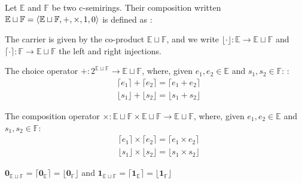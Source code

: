 \begin{definition}Let $\mathbb{E}$ and $\mathbb{F}$ be two c-semirings. Their composition written $\mathbb{E} \sqcup \mathbb{F} = \left\langle \mathbb{E} \sqcup \mathbb{F}, +, \times, \boldmath{1},\boldmath{0} \right\rangle$ is defined as :
	\begin{list}{-}{}
		\item The carrier is given by the co-product $\mathbb{E} \sqcup \mathbb{F}$, and we write $\lfloor \cdot \rfloor : \mathbb{E} \rightarrow \mathbb{E} \sqcup \mathbb{F}$ and $\lceil \cdot \rceil : \mathbb{F} \rightarrow \mathbb{E} \sqcup \mathbb{F}$ the left and right injections.
		\item The choice operator $+ : 2^{\mathbb{E} \sqcup \mathbb{F}} \rightarrow \mathbb{E} \sqcup \mathbb{F}$, where, given $e_1,e_2 \in \mathbb{E}$ and $s_1,s_2 \in \mathbb{F}$: : 
		\begin{align*}
			& \lceil e_1 \rceil + \lceil e_2 \rceil = \lceil e_1 + e_2 \rceil \\
			& \lfloor s_1 \rfloor + \lfloor s_2 \rfloor = \lfloor s_1 + s_2 \rfloor  %
		\end{align*}
		\item The composition operator $\times : \mathbb{E} \sqcup \mathbb{F} \times \mathbb{E} \sqcup \mathbb{F} \rightarrow \mathbb{E} \sqcup \mathbb{F}$, where, given $e_1,e_2 \in \mathbb{E}$ and $s_1,s_2 \in \mathbb{F}$:
		\begin{align*}
			& \lceil e_1 \rceil \times \lceil e_2 \rceil = \lceil e_1 \times e_2 \rceil \\
			& \lfloor s_1 \rfloor \times \lfloor s_2 \rfloor = \lfloor s_1 \times s_2 \rfloor 
		\end{align*}
		\item $\textbf{0}_{\mathbb{E} \sqcup \mathbb{F}}=\lceil\textbf{0}_{\mathbb{E}}\rceil=\lfloor\textbf{0}_{\mathbb{F}}\rfloor$ and $\textbf{1}_{\mathbb{E} \sqcup \mathbb{F}}=\lceil\textbf{1}_{\mathbb{E}}\rceil=\lfloor\textbf{1}_{\mathbb{F}}\rfloor$
	\end{list}
\end{definition}
